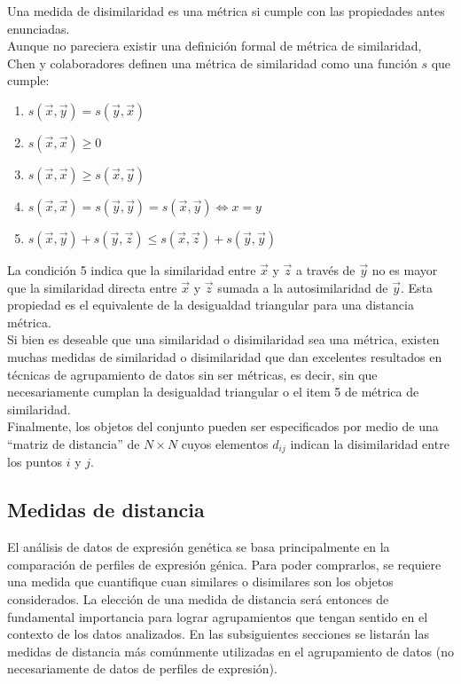 Una medida de disimilaridad es una métrica si cumple con las propiedades antes enunciadas. \\
Aunque no pareciera existir una definición formal de métrica de similaridad, Chen y colaboradores definen una métrica de similaridad como una función $s$ que cumple:
\begin{enumerate}
\item $s(\vec{x}, \vec{y}) = s(\vec{y}, \vec{x})$
\item $s(\vec{x}, \vec{x}) \geq 0$
\item $s(\vec{x}, \vec{x}) \geq s(\vec{x}, \vec{y})$
\item $s(\vec{x}, \vec{x}) = s(\vec{y}, \vec{y}) = s(\vec{x}, \vec{y}) \iff x=y$
\item $s(\vec{x}, \vec{y}) + s(\vec{y}, \vec{z}) \leq s(\vec{x}, \vec{z}) + s(\vec{y}, \vec{y})$
\end{enumerate}
La condición 5 indica que la similaridad entre $\vec{x}$ y $\vec{z}$ a través de $\vec{y}$ no es mayor que la similaridad directa entre $\vec{x}$ y $\vec{z}$ sumada a la autosimilaridad de $\vec{y}$. Esta propiedad es el equivalente de la desigualdad triangular para una distancia métrica.\\
Si bien es deseable que una similaridad o disimilaridad sea una métrica, existen muchas medidas de similaridad o disimilaridad que dan excelentes resultados en técnicas de agrupamiento de datos sin ser métricas, es decir, sin que necesariamente cumplan la desigualdad triangular o el item 5 de métrica de similaridad.\cite{Chen2009}\\
Finalmente, los objetos del conjunto pueden ser especificados por medio de una ``matriz de distancia'' de $N\times N$ cuyos elementos $d_{ij}$ indican la disimilaridad entre los puntos $i$ y $j$.\cite{Halkidi2001, Domany1999, Gan2007, Kheng2010}

\subsection{Medidas de distancia}
El análisis de datos de expresión genética se basa principalmente en la comparación de perfiles de expresión génica. Para poder comprarlos, se requiere una medida que cuantifique cuan similares o disimilares son los objetos considerados. La elección de una medida de distancia será entonces de fundamental importancia para lograr agrupamientos que tengan sentido en el contexto de los datos analizados. En las subsiguientes secciones se listarán las medidas de distancia más comúnmente utilizadas en el agrupamiento de datos (no necesariamente de datos de perfiles de expresión).
